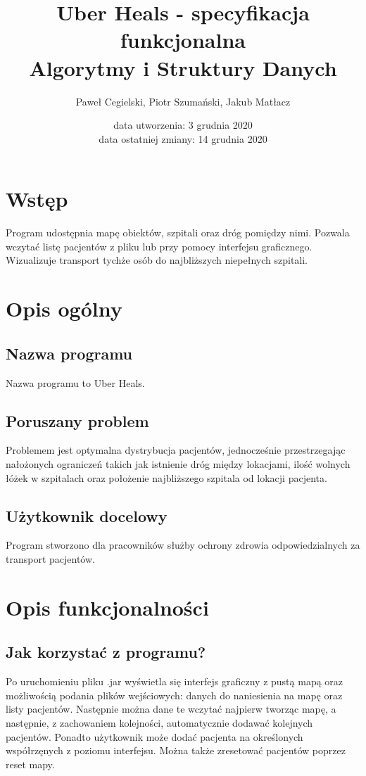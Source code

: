 \documentclass[11pt, a4paper]{article}
\title{\textbf{Uber Heals - specyfikacja funkcjonalna}\\
    Algorytmy i Struktury Danych}
\author{Paweł Cegielski, Piotr Szumański, Jakub Matłacz}
\date{data utworzenia: 3 grudnia 2020\\
    data ostatniej zmiany: 14 grudnia 2020}
\begin{document}
\maketitle

\section{Wstęp}
Program udostępnia mapę obiektów, szpitali oraz dróg pomiędzy nimi. Pozwala wczytać listę pacjentów z pliku lub przy pomocy interfejsu graficznego. Wizualizuje transport tychże osób do najbliższych niepełnych szpitali. 

\section{Opis ogólny}
    \subsection{Nazwa programu}
    Nazwa programu to Uber Heals.
    \subsection{Poruszany problem}
    Problemem jest optymalna dystrybucja pacjentów, jednocześnie przestrzegając nałożonych ograniczeń takich jak istnienie dróg między lokacjami, ilość wolnych łóżek w szpitalach oraz położenie najbliższego szpitala od lokacji pacjenta.
    \subsection{Użytkownik docelowy}
    Program stworzono dla pracowników służby ochrony zdrowia odpowiedzialnych za transport pacjentów.
\section{Opis funkcjonalności}
    \subsection{Jak korzystać z programu?}
    Po uruchomieniu pliku .jar wyświetla się interfejs graficzny z pustą mapą oraz możliwością podania plików wejściowych: danych do naniesienia na mapę oraz listy pacjentów. Następnie można dane te wczytać najpierw tworząc mapę, a następnie, z zachowaniem kolejności, automatycznie dodawać kolejnych pacjentów. Ponadto użytkownik może dodać pacjenta na określonych współrzęnych z poziomu interfejsu. Można także zresetować pacjentów poprzez reset mapy.
\end{document}

